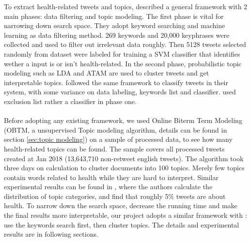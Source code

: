 To extract health-related tweets and topics, \cite{paul2014discovering, paul2011you} described a general framework with 2 main phases: data filtering and topic modeling. The first phase is vital for narrowing down search space. They adopt keyword searching and machine learning as data filtering method. 269 keywords and 20,000 keyphrases were collected and used to filter out irrelevant data roughly. Then 5128 tweets selected randomly from dataset were labeled for training a SVM classifier that identifies wether a input is or isn't health-related. In the second phase, probabilistic topic modeling such as LDA and ATAM are used to cluster tweets and get interpretable topics. \cite{serban2019real,sadilek2012modeling} followed the same framework to classify tweets in their system, with some variance on data labeling, keywords list and classifier. \cite{elkin2017network} used exclusion list rather a classifier in phase one. 
\\\\
Before adopting any existing framework, we used Online Biterm Term Modeling (OBTM, a unsupervised Topic modeling algorithm, details can be found in section \ref{sec:topic modeling}) on a sample of processed data, to see how many health-related topics can be found. The sample covers all processed tweets created at Jan 2018 (13,643,710 non-retweet english tweets). The algorithm took three days on calculation to cluster documents into 100 topics. Merely few topics contain words related to health while they are hard to interpret. Similar experimental results can be found in \cite{zhao2011comparing}, where the authors calculate the distribution of topic categories, and find that roughly 5\% tweets are about health. To narrow down the search space, decrease the running time and make the final results more interpretable, our project adopts a similar framework with \cite{paul2014discovering}: use the keywords search first, then cluster topics. The details and experimental results are in following sections.

